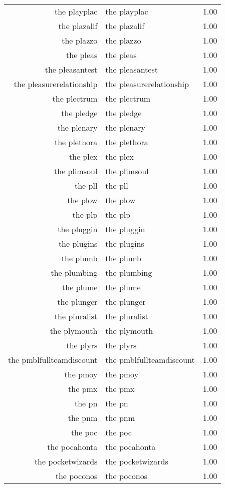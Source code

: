 \begin{table}[ht]
\begin{tabular}{rlr}
  the playplac & the playplac & 1.00 \\ 
  the plazalif & the plazalif & 1.00 \\ 
  the plazzo & the plazzo & 1.00 \\ 
  the pleas & the pleas & 1.00 \\ 
  the pleasantest & the pleasantest & 1.00 \\ 
  the pleasurerelationship & the pleasurerelationship & 1.00 \\ 
  the plectrum & the plectrum & 1.00 \\ 
  the pledge & the pledge & 1.00 \\ 
  the plenary & the plenary & 1.00 \\ 
  the plethora & the plethora & 1.00 \\ 
  the plex & the plex & 1.00 \\ 
  the plimsoul & the plimsoul & 1.00 \\ 
  the pll & the pll & 1.00 \\ 
  the plow & the plow & 1.00 \\ 
  the plp & the plp & 1.00 \\ 
  the pluggin & the pluggin & 1.00 \\ 
  the plugins & the plugins & 1.00 \\ 
  the plumb & the plumb & 1.00 \\ 
  the plumbing & the plumbing & 1.00 \\ 
  the plume & the plume & 1.00 \\ 
  the plunger & the plunger & 1.00 \\ 
  the pluralist & the pluralist & 1.00 \\ 
  the plymouth & the plymouth & 1.00 \\ 
  the plyrs & the plyrs & 1.00 \\ 
  the pmblfullteamdiscount & the pmblfullteamdiscount & 1.00 \\ 
  the pmoy & the pmoy & 1.00 \\ 
  the pmx & the pmx & 1.00 \\ 
  the pn & the pn & 1.00 \\ 
  the pnm & the pnm & 1.00 \\ 
  the poc & the poc & 1.00 \\ 
  the pocahonta & the pocahonta & 1.00 \\ 
  the pocketwizards & the pocketwizards & 1.00 \\ 
  the poconos & the poconos & 1.00 \\ 

\end{tabular}
\end{table}

